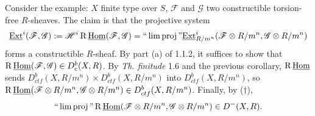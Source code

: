 \documentclass[deligne.tex]{subfiles}
\begin{document}
Consider the example: $X$ finite type over $S$, $\mathscr F$ and
$\mathscr G$ two constructible torsion-free $R$-sheaves. The claim is
that the projective system
\begin{equation*}
    \underline{\operatorname{Ext}}^i(\mathscr F,\mathscr G)
    :=\mathscr H^i\operatorname{R}\underline{\operatorname{Hom}}(\mathscr F,\mathscr G)=
    \text{``}\lim\operatorname{proj}\text{''}\underline{\operatorname{Ext}}^i_{R/m^n}(\mathscr F\otimes R/m^n,\mathscr G\otimes R/m^n)
\end{equation*}
forms a constructible $R$-sheaf.
By part (a) of 1.1.2, it suffices to show that
$\operatorname{R}\underline{\operatorname{Hom}}(\mathscr F,\mathscr G)\in D_c^b(X,R)$.
By \textit{Th. finitude} 1.6 and the previous corollary,
$\operatorname{R}\underline{\operatorname{Hom}}$ sends $D_{ctf}^b(X,R/m^n)\times D_{ctf}^b(X,R/m^n)$ into
$D_{ctf}^b(X,R/m^n)$, so
$\operatorname{R}\underline{\operatorname{Hom}}(\mathscr F\otimes R/m^n,\mathscr G\otimes R/m^n)\in D_{ctf}^b(X,R/m^n)$.
Finally, by ($\dagger$),
\begin{equation*}
    \text{``}\lim\operatorname{proj}\text{''}
    \operatorname{R}\underline{\operatorname{Hom}}(\mathscr F\otimes R/m^n,\mathscr G\otimes R/m^n)\in D^-(X,R).
\end{equation*}
\end{document}
